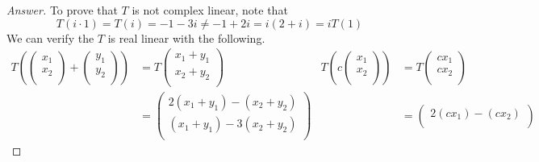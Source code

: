 \documentclass[../psets.tex]{subfiles}
\begin{document}
\begin{enumerate}[label={\textbf{3.\arabic*.}}]
\begin{enumerate}
        \begin{proof}[Answer]
            To prove that $T$ is not complex linear, note that
            \begin{equation*}
                T(i\cdot 1) = T(i) = -1-3i \neq -1+2i = i(2+i) = iT(1)
            \end{equation*}
            We can verify the $T$ is real linear with the following.
            \begin{align*}
                T\left( 
                    \begin{pmatrix}
                        x_1\\
                        x_2\\
                    \end{pmatrix}
                    +
                    \begin{pmatrix}
                        y_1\\
                        y_2\\
                    \end{pmatrix}
                \right) &= T
                \begin{pmatrix}
                    x_1+y_1\\
                    x_2+y_2\\
                \end{pmatrix}&
                    T\left( c
                        \begin{pmatrix}
                            x_1\\
                            x_2\\
                        \end{pmatrix}
                    \right) &= T
                    \begin{pmatrix}
                        cx_1\\
                        cx_2\\
                    \end{pmatrix}\\
                &=
                \begin{pmatrix}
                    2(x_1+y_1)-(x_2+y_2)\\
                    (x_1+y_1)-3(x_2+y_2)\\
                \end{pmatrix}&
                    &=
                    \begin{pmatrix}
                        2(cx_1)-(cx_2)\\

\end{pmatrix}
\end{align*}
\end{proof}
\end{enumerate}
\end{enumerate}
\end{document}
